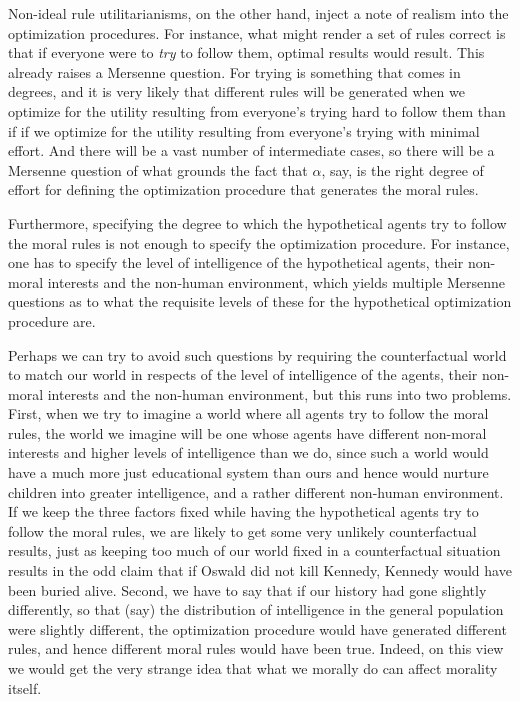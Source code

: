 Non-ideal rule utilitarianisms, on the other hand, inject a note of realism into the optimization procedures. For instance,
what might render a set of rules correct is that if everyone were to \textit{try} to follow them, optimal results would
result. This already raises a Mersenne question. For trying is something that comes in degrees, and it is very likely that
different rules will be generated when we optimize for the utility resulting from everyone's trying hard to follow them
than if if we optimize for the utility resulting from everyone's trying with minimal effort. And there will be a vast
number of intermediate cases, so there will be a Mersenne question of what grounds the fact that $\alpha$, say, is
the right degree of effort for defining the optimization procedure that generates the moral rules.

Furthermore, specifying the degree to which the hypothetical agents try to follow the moral rules is not enough to specify the
optimization procedure. For instance, one has to specify the level of intelligence of the hypothetical agents, their non-moral 
interests and the non-human environment, which yields multiple Mersenne questions as to what the requisite levels of these for the 
hypothetical optimization procedure are. 

Perhaps we can try to avoid such questions by requiring the counterfactual world to match our
world in respects of the level of intelligence of the agents, their non-moral interests and the
non-human environment, but this runs into two problems.
First, when we try to imagine a world where all agents try to follow the moral rules, the world we imagine
will be one whose agents have different non-moral
interests and higher levels of intelligence than we do, since such a world would have a much more just educational system
than ours and hence would nurture children into greater intelligence, and a rather different non-human environment. If 
we keep the three factors fixed while having the hypothetical agents try to follow the moral rules, we are likely to get
some very unlikely counterfactual results, just as keeping too much of our world fixed in a counterfactual situation
results in the odd claim that if Oswald did not kill Kennedy, Kennedy would have been buried alive. 
Second, we have to say that if our history had gone slightly differently, so that (say) the distribution of intelligence in the
general population were slightly different, the optimization procedure would have generated different rules, and hence different
moral rules would have been true. Indeed, on this view we would get the very strange idea that what we morally do can affect morality
itself.

